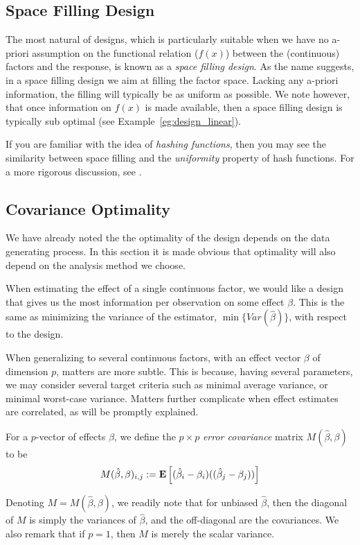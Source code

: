 \subsection{Space Filling Design}
\label{sec:space_filling}
The most natural of designs, which is particularly suitable when we have no a-priori assumption on the functional relation ($f(x)$) between the (continuous) factors and the response, is known as a \emph{space filling design}.
As the name suggests, in a space filling design we aim at filling the factor space. Lacking any a-priori information, the filling will typically be as uniform as possible. 
We note however, that once information on $f(x)$ is made available, then a space filling design is typically sub optimal (see Example~\ref{eg:design_linear}).

\begin{extra}
If you are familiar with the idea of \emph{hashing functions}, then you may see the similarity between space filling and the \emph{uniformity} property of hash functions. 
For a more rigorous discussion, see \cite{hill_first_1986}.
\end{extra}



\subsection{Covariance Optimality}
We have already noted the the optimality of the design depends on the data generating process.
In this section it is made obvious that optimality will also depend on the analysis method we choose.

When estimating the effect of a single continuous factor, we would like a design that gives us the most information per observation on some effect $\beta$. 
This is the same as minimizing the variance of the estimator, $\min \{Var(\hat{\beta})\}$, with respect to the design.

When generalizing to several continuous factors, with an effect vector $\beta$ of dimension $p$, matters are more subtle.
This is because, having several parameters, we may consider several target criteria such as
minimal average variance, or minimal worst-case variance.
Matters further complicate when effect estimates are correlated, as will be promptly explained. 


\begin{definition}
For a $p$-vector of effects $\beta$, we define the $p \times p$ \emph{error covariance} matrix $M(\hat{\beta},\beta)$ to be 
\begin{align}
	M(\hat{\beta},\beta)_{i,j}:= \mathbf{E}\left[ (\hat{\beta}_i-\beta_i)((\hat{\beta}_j-\beta_j)) \right]  
\end{align}
\end{definition}
Denoting $M=M(\hat{\beta},\beta)$, we readily note that for unbiased $\hat{\beta}$, then the diagonal of $M$ is simply the variances of $\hat{\beta}$, and the off-diagonal are the covariances. 
We also remark that if $p=1$, then $M$ is merely the scalar variance. 

